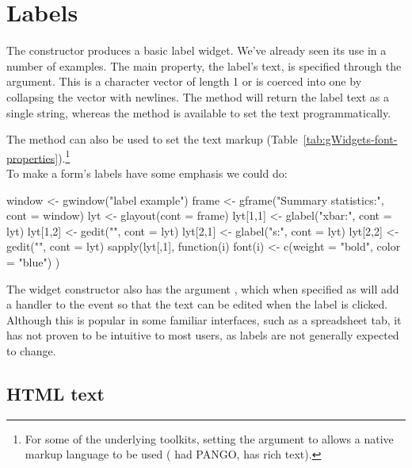 

\section{Labels}
\label{asec:gWidgets-labels}

The  constructor produces a basic label
widget. We've already seen its use in a number of examples. The main
property, the label's text, is specified through the
 argument. This is a character vector of length
1 or is coerced into one by collapsing the vector with newlines. The
 method will return the label text as a single
string, whereas the  method is
available to set the text programmatically.

The  method
can also be used to set the text markup
(Table~\ref{tab:gWidgets-font-properties}).\footnote{For some of the underlying toolkits, setting the argument
 to  allows a native markup language
to be used (\GTK\/ had PANGO, \Qt\/ has rich text).}
\\

To make a form's labels have some emphasis we could do:
\begin{Schunk}
\begin{Sinput}
 window <- gwindow("label example")
 frame <- gframe("Summary statistics:", cont = window)
 lyt <- glayout(cont = frame)
 lyt[1,1] <- glabel("xbar:", cont = lyt)
 lyt[1,2] <- gedit("", cont = lyt)
 lyt[2,1] <- glabel("s:", cont = lyt)
 lyt[2,2] <- gedit("", cont = lyt)
 sapply(lyt[,1], function(i) {
   font(i) <- c(weight = "bold", color = "blue")
 })
\end{Sinput}
\end{Schunk}


The widget constructor also has the argument
, which when specified as  will
add a handler to the event so that the text can be edited when the
label is clicked.  Although this is popular in some familiar
interfaces, such as a spreadsheet tab, it has not proven to be
intuitive to most users, as labels are not generally expected to change.

\subsection{HTML text}
\label{sec:html-text}

